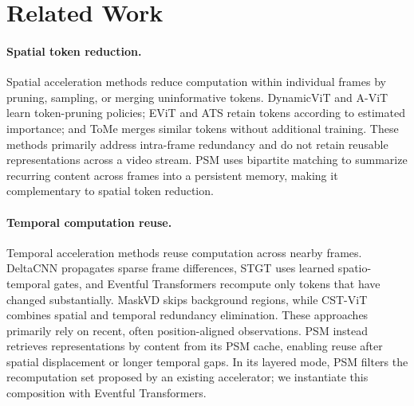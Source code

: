 \documentclass[letterpaper]{article}
\begin{document}
 
 
 
 
 
 
\section{Related Work}\label{sec:relatedwork}
 
 
\paragraph{Spatial token reduction.}
Spatial acceleration methods reduce computation within individual frames
by pruning, sampling, or merging uninformative tokens. DynamicViT
\cite{dynamicvit} and A-ViT \cite{avit} learn token-pruning policies;
EViT \cite{evit} and ATS \cite{ats} retain tokens according to estimated
importance; and ToMe \cite{tome} merges similar tokens without additional
training. These methods primarily address intra-frame redundancy and do
not retain reusable representations across a video stream. PSM uses
bipartite matching to summarize recurring content across frames into a
persistent memory, making it complementary to spatial token reduction.
 
\paragraph{Temporal computation reuse.}
Temporal acceleration methods reuse computation across nearby frames.
DeltaCNN \cite{deltacnn} propagates sparse frame differences, STGT
\cite{stgt} uses learned spatio-temporal gates, and Eventful Transformers
\cite{eventful} recompute only tokens that have changed substantially.
MaskVD \cite{maskvd} skips background regions, while CST-ViT
\cite{cstvit} combines spatial and temporal redundancy elimination.
These approaches primarily rely on recent, often position-aligned
observations. PSM instead retrieves representations by content from
its PSM cache, enabling reuse after spatial displacement or
longer temporal gaps. In its layered mode, PSM filters the
recomputation set proposed by an existing accelerator; we instantiate
this composition with Eventful Transformers.
 
\end{document}
